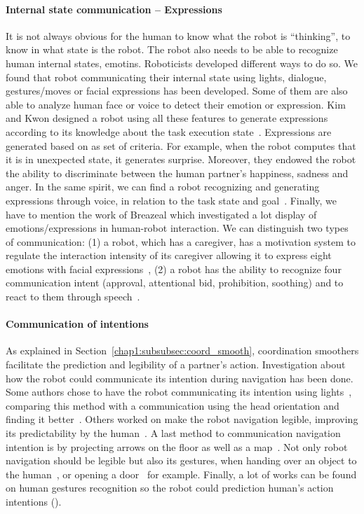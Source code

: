 \documentclass[a4paper,11pt,twoside]{StyleThese}
\begin{document}
\paragraph{Internal state communication -- Expressions}
It is not always obvious for the human to know what the robot is ``thinking'', \ie to know in what state is the robot. The robot also needs to be able to recognize human internal states, emotins. Roboticists developed different ways to do so. We found that robot communicating their internal state using lights, dialogue, gestures/moves or facial expressions has been developed. Some of them are also able to analyze human face or voice to detect their emotion or expression. Kim and Kwon designed a robot using all these features to generate expressions according to its knowledge about the task execution state~\cite{kim_2010_computational}. Expressions are generated based on as set of criteria. For example, when the robot computes that it is in unexpected state, it generates surprise. Moreover, they endowed the robot the ability to discriminate between the human partner's happiness, sadness and anger. In the same spirit, we can find a robot recognizing and generating expressions through voice, in relation to the task state and goal~\cite{scheutz_2006_utility}. Finally, we have to mention the work of Breazeal which investigated a lot display of emotions/expressions in human-robot interaction. We can distinguish two types of communication: (1) a robot, which has a caregiver, has a motivation system to regulate the interaction intensity of its caregiver allowing it to express eight emotions with facial expressions~\cite{breazeal_1998_motivational, breazeal_2004_function}, (2) a robot has the ability to recognize four communication intent (approval, attentional bid, prohibition, soothing) and to react to them through speech~\cite{breazeal_2002_regulation, breazeal_2003_emotion}.

\paragraph{Communication of intentions} As explained in Section~\ref{chap1:subsubsec:coord_smooth}, coordination smoothers facilitate the prediction and legibility of a partner's action. Investigation about how the robot could communicate its intention during navigation has been done. Some authors chose to have the robot communicating its intention using lights~\cite{szafir_2015_communicating}, comparing this method with a communication using the head orientation and finding it better~\cite{may_2015_show}. Others worked on make the robot navigation legible, improving its predictability by the human~\cite{dragan_2013_legibility, alami_2006_toward}. A last method to communication navigation intention is by projecting arrows on the floor as well as a map~\cite{chadalavada_2015_mind, coovert_2014_spatial}.  Not only robot navigation should be legible but also its gestures, when handing over an object to the human~\cite{sisbot_2012_human}, or opening a door~\cite{takayama_2011_expressing} for example. Finally, a lot of works can be found on human gestures recognition so the robot could prediction human's action intentions (\eg\cite{barros_2017_dynamic, chang_2018_effects}).
\end{document}
